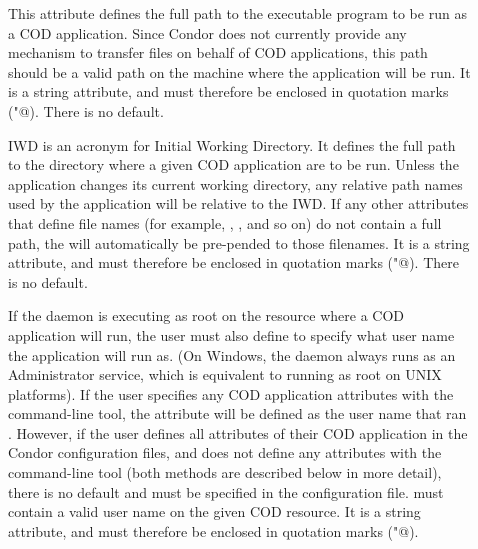 \begin{description}

 \item[] This attribute 
   defines the full path to the executable program to be run as a
   COD application.
   Since Condor does not currently provide any mechanism to transfer
   files on behalf of COD applications, this path should be a valid
   path on the machine where the application will be run.
   It is a string attribute, and must therefore be enclosed in
   quotation marks (\verb@"@).
   There is no default.

 \item[] IWD is an acronym for Initial Working Directory.
   It defines the full path to the directory where a given COD
   application are to be run.
   Unless the application changes its current working directory, any
   relative path names used by the application will be relative to
   the IWD.
   If any other attributes that define file names (for example,
   , , and so on) do not contain a full path, the
    will automatically be pre-pended to those filenames.
   It is a string attribute, and must therefore be enclosed in 
   quotation marks (\verb@"@).
   There is no default.

 \item[] If the  daemon is executing as root on
   the resource where a COD application will run, the user must also
   define  to specify what user name the application will
   run as.
   (On Windows, the  daemon always runs as an Administrator
   service, which is equivalent to running as root on UNIX platforms).
   If the user specifies any COD application attributes with the
    command-line tool, the 
   attribute will be defined as the user name that ran
   .
   However, if the user defines all attributes of their COD
   application in the Condor configuration files, and does not define
   any attributes with the  command-line tool
   (both methods are described below in more detail), there is no
   default and  must be specified in the configuration
   file.
    must contain a valid user
   name on the given COD resource. 
   It is a string attribute, and must therefore be enclosed in 
   quotation marks (\verb@"@).

\end{description}

